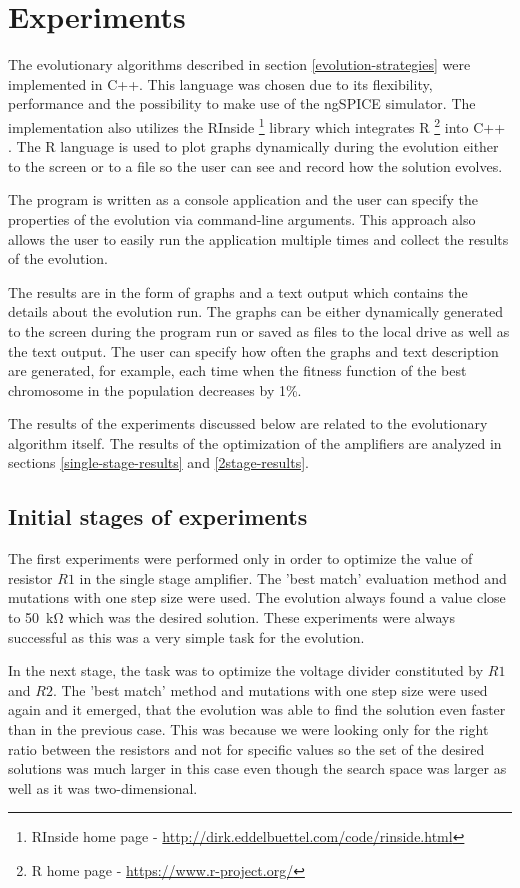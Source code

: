 \chapter{Experiments}
The evolutionary algorithms described in section \ref{evolution-strategies} were implemented in C++. This language was chosen due to its flexibility, performance and the possibility to make use of the ngSPICE simulator. The implementation also utilizes the RInside \footnote{RInside home page - \url{http://dirk.eddelbuettel.com/code/rinside.html}} library which integrates R \footnote{R home page - \url{https://www.r-project.org/}} into C++ \cite{Rcpp}. The R language is used to plot graphs dynamically during the evolution either to the screen or to a file so the user can see and record how the solution evolves.

The program is written as a console application and the user can specify the properties of the evolution via command-line arguments. This approach also allows the user to easily run the application multiple times and collect the results of the evolution.

The results are in the form of graphs and a text output which contains the details about the evolution run. The graphs can be either dynamically generated to the screen during the program run or saved as files to the local drive as well as the text output. The user can specify how often the graphs and text description are generated, for example, each time when the fitness function of the best chromosome in the population decreases by 1\%.

The results of the experiments discussed below are related to the evolutionary algorithm itself. The results of the optimization of the amplifiers are analyzed in sections \ref{single-stage-results} and \ref{2stage-results}.

\section{Initial stages of experiments}
The first experiments were performed only in order to optimize the value of resistor $R1$ in the single stage amplifier. The 'best match' evaluation method and mutations with one step size were used. The evolution always found a value close to \SI{50}{\kilo\ohm} which was the desired solution. These experiments were always successful as this was a very simple task for the evolution.

In the next stage, the task was to optimize the voltage divider constituted by $R1$ and $R2$. The 'best match' method and mutations with one step size were used again and it emerged, that the evolution was able to find the solution even faster than in the previous case. This was because we were looking only for the right ratio between the resistors and not for specific values so the set of the desired solutions was much larger in this case even though the search space was larger as well as it was two-dimensional.

